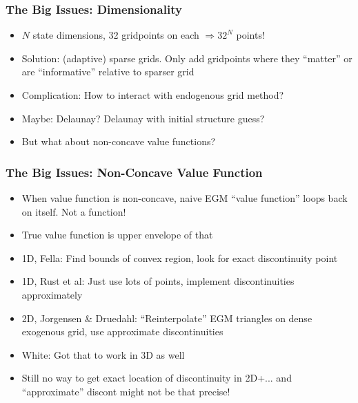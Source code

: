 \documentclass[11pt]{beamer}
\newcommand{\bi}{\begin{itemize}}
\newcommand{\ei}{\end{itemize}}
\begin{document}
\begin{frame}
\frametitle{The Big Issues: Dimensionality}

\bi
\item <1->$N$ state dimensions, 32 gridpoints on each $\Longrightarrow 32^N$ points!

\item <2->Solution: (adaptive) sparse grids.  Only add gridpoints where they ``matter'' or are ``informative'' relative to sparser grid

\item <3->Complication: How to interact with endogenous grid method?

\item <3->Maybe: Delaunay?  Delaunay with initial structure guess?

\item <4->But what about non-concave value functions?

\ei
\end{frame}


\begin{frame}
\frametitle{The Big Issues: Non-Concave Value Function}

\bi
\item <1->When value function is non-concave, naive EGM ``value function'' loops back on itself. Not a function!

\item <1->True value function is upper envelope of that

\item <2->1D, Fella: Find bounds of convex region, look for exact discontinuity point

\item <2->1D, Rust et al: Just use lots of points, implement discontinuities approximately

\item <3->2D, Jorgensen \& Druedahl: ``Reinterpolate'' EGM triangles on dense exogenous grid, use approximate discontinuities

\item <3->White: Got that to work in 3D as well

\item <4->Still no way to get exact location of discontinuity in 2D+... and ``approximate'' discont might not be that precise!

\ei
\end{frame}
\end{document}
